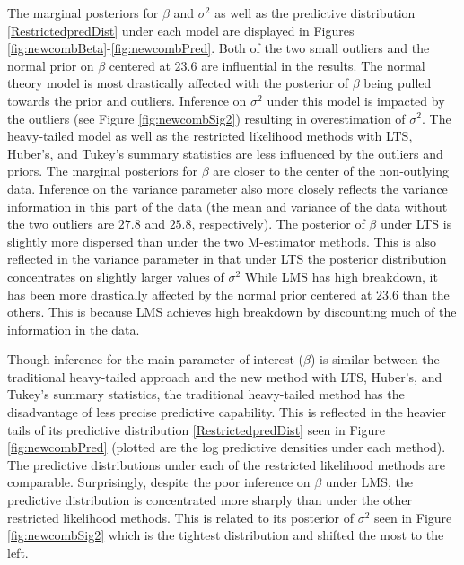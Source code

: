 \documentclass[12pt]{article}
\newcommand{\red}[1]{{\color{red}#1}}
\newcommand{\green}[1]{{\color{green}#1}}
\begin{document}
The marginal posteriors for $\beta$ and $\sigma^{2}$ as well as the
predictive distribution \eqref{RestrictedpredDist} under each model
are displayed in Figures
\ref{fig:newcombBeta}-\ref{fig:newcombPred}. Both of the two small
outliers and the normal prior on $\beta$ centered at $23.6$ are
influential in the results. The normal theory model is most
drastically affected with the posterior of $\beta$ being pulled
towards the prior and outliers. Inference on $\sigma^{2}$ under this
model is impacted by the outliers (see Figure
\ref{fig:newcombSig2}) \green{resulting in overestimation of $\sigma^{2}$}. 
The heavy-tailed model as well as the
restricted likelihood methods with LTS, Huber's, and Tukey's summary
statistics are less influenced by the outliers and priors. The
marginal posteriors for $\beta$ are closer to the center of the
non-outlying data. Inference on the variance parameter also more
closely reflects the variance information in this part of the data
(the mean and variance of the data without the two outliers are $27.8$
and $25.8$, respectively). The posterior of $\beta$ under LTS is
slightly more dispersed than under the two M-estimator methods. This is
also reflected in the variance parameter in that under LTS the posterior distribution \green{concentrates on 
slightly larger values of $\sigma^2$} %
While LMS has high breakdown, it has been more drastically affected by the normal prior centered at $23.6$ than the others. This is %
because LMS achieves high breakdown by discounting much of the information in the data. 

Though inference for the main parameter of interest ($\beta$) is
similar between the traditional heavy-tailed approach and the new
method with LTS, Huber's, and Tukey's summary statistics,  the
traditional heavy-tailed method has the disadvantage of less precise
predictive capability. This is reflected in the heavier tails of its
predictive distribution  \eqref{RestrictedpredDist} seen in Figure
\ref{fig:newcombPred} (plotted are the log predictive \green{densities} %
under each method). The predictive distributions under each of the
restricted likelihood methods are comparable. Surprisingly, despite the poor
inference on $\beta$ under LMS, the predictive distribution is
\green{concentrated more sharply} than \green{under} the other restricted likelihood methods. This is
related to its posterior of $\sigma^{2}$ seen in
Figure \ref{fig:newcombSig2}  which is the tightest
distribution and shifted the most to the left. 
\end{document}
